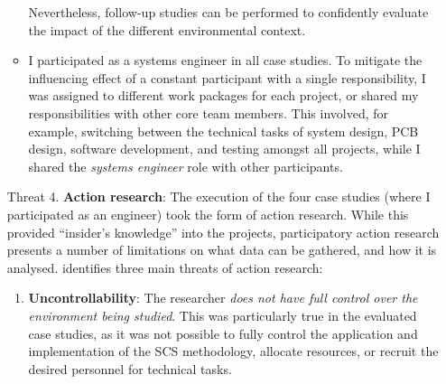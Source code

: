 \documentclass[a4paper,nobib,justified,final]{tufte-book}
\begin{document}
\begin{fullwidth}
\begin{enumerate}
\begin{itemize}[itemsep=-2ex]
		Nevertheless, follow-up studies can be performed to confidently evaluate the impact of the different environmental context.
		\item I participated as a systems engineer in all case studies. To mitigate the influencing effect of a constant participant with a single responsibility, I was assigned to different work packages for each project, or shared my responsibilities with other core team members. This involved, for example, switching between the technical tasks of system design, \acs{PCB} design, software development, and testing amongst all projects, while I shared the \emph{systems engineer} role with other participants.
	\end{itemize}
	
	

	\item[Threat 4.] \textbf{Action research}: The execution of the four case studies (where I participated as an engineer) took the form of action research. While this provided ``insider's knowledge'' into the projects, participatory action research presents a number of limitations on what data can be gathered, and how it is analysed. \citeauthor{kockThreeThreatsAction2004} identifies three main threats of action research: \cite{kockThreeThreatsAction2004}
	\begin{enumerate}[itemsep=-1pt]
		\item \textbf{Uncontrollability}: The researcher \emph{does not have full control over the environment being studied}.
		This was particularly true in the evaluated case studies, as it was not possible to fully control the application and implementation of the \acs{SCS} methodology, allocate resources, or recruit the desired personnel for technical tasks.


\end{enumerate}
\end{enumerate}
\end{fullwidth}
\end{document}
